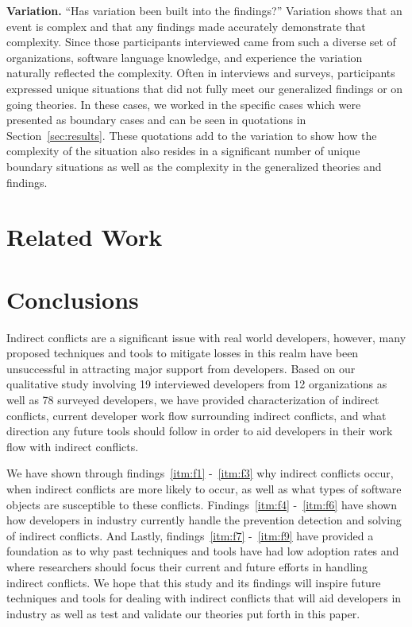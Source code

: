 \documentclass[conference]{IEEEtran}
\begin{document}
{\bfseries Variation.} ``Has variation been built into the findings?'' Variation shows that an event is complex and that any findings
made accurately demonstrate that complexity. Since those participants interviewed came from such a diverse set of organizations, 
software language knowledge, and experience the variation naturally reflected the complexity. Often in interviews and surveys, participants
expressed unique situations that did not fully meet our generalized findings or on going theories. In these cases, we worked in the specific
cases which were presented as boundary cases and can be seen in quotations in Section~\ref{sec:results}. These quotations add to the variation
to show how the complexity of the situation also resides in a significant number of unique boundary situations as well as the complexity
in the generalized theories and findings.

\section{Related Work}
\label{sec:related}


\section{Conclusions}
\label{sec:conc}

Indirect conflicts are a significant issue with real world developers, however, many proposed techniques and tools to mitigate
losses in this realm have been unsuccessful in attracting major support from developers. Based on our qualitative study involving
19 interviewed developers from 12 organizations as well as 78 surveyed developers, we have provided characterization of indirect conflicts,
current developer work flow surrounding indirect conflicts, and what direction any future tools should follow in order to aid developers
in their work flow with indirect conflicts.

We have shown through findings~\ref{itm:f1} -~\ref{itm:f3} why indirect conflicts occur, when indirect conflicts are more likely to
occur, as well as what types of software objects are susceptible to these conflicts. Findings~\ref{itm:f4} -~\ref{itm:f6} have shown
how developers in industry currently handle the prevention detection and solving of indirect conflicts. And Lastly, findings~\ref{itm:f7} 
-~\ref{itm:f9} have provided a foundation as to why past techniques and tools have had low adoption rates and where
researchers should focus their current and future efforts in handling indirect conflicts. We hope that this study and its 
findings will inspire future techniques and tools for dealing with indirect conflicts that 
will aid developers in industry as well as test and validate our theories put forth in this paper.
\end{document}
